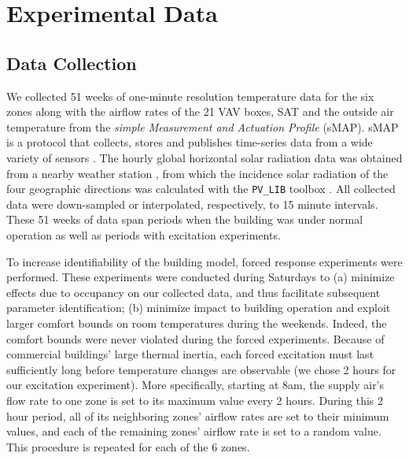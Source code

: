 
\section{Experimental Data}
\label{sec:Preliminaries}


\subsection{Data Collection}\label{sec:exp_data}
We collected 51 weeks of one-minute resolution temperature data for the six zones along with the airflow rates of the 21 VAV boxes, SAT and the outside air temperature from the \textit{simple Measurement and Actuation Profile} (sMAP). sMAP is a protocol that collects, stores and publishes time-series data from a wide variety of sensors \cite{smap, Dawson-Haggerty:2012aa}. The hourly global horizontal solar radiation data was obtained from a nearby weather station \cite{SolarRad}, from which the incidence solar radiation of the four geographic directions was calculated with the \texttt{PV\_LIB} toolbox \cite{pv_model}. All collected data were down-sampled or interpolated, respectively, to 15 minute intervals. 
These 51 weeks of data span periods when the building was under normal operation as well as periods with excitation experiments. 

To increase identifiability of the building model, forced response experiments were performed. These experiments were conducted during Saturdays to (a) minimize effects due to occupancy on our collected data, and thus facilitate subsequent parameter identification; (b) minimize impact to building operation and exploit larger comfort bounds on room temperatures during the weekends. Indeed, the comfort bounds were never violated during the forced experiments. 
Because of commercial buildings' large thermal inertia, each forced excitation must last sufficiently long before temperature changes are observable (we chose 2 hours for our excitation experiment).
More specifically, starting at 8am, the supply air's flow rate to one zone is set to its maximum value every 2 hours. During this 2 hour period, all of its neighboring zones' airflow rates are set to their minimum values, and each of the remaining zones' airflow rate is set to a random value. 
This procedure is repeated for each of the 6 zones. 

